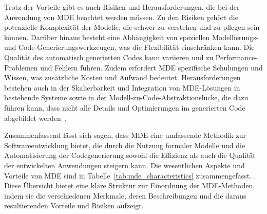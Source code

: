Trotz der Vorteile gibt es auch Risiken und Herausforderungen, die bei der Anwendung von MDE beachtet werden 
müssen. Zu den Risiken gehört die potenzielle Komplexität der Modelle, die schwer zu verstehen und zu pflegen sein 
können. Darüber hinaus besteht eine Abhängigkeit von speziellen Modellierungs- und Code-Generierungswerkzeugen, was 
die Flexibilität einschränken kann. Die Qualität des automatisch generierten Codes kann variieren und zu 
Performance-Problemen und Fehlern führen. Zudem erfordert MDE spezifische Schulungen und Wissen, was zusätzliche
Kosten und Aufwand bedeutet. Herausforderungen bestehen auch in der Skalierbarkeit und Integration von MDE-Lösungen 
in bestehende Systeme sowie in der Modell-zu-Code-Abstraktionslücke, die dazu führen kann, dass nicht alle Details 
und Optimierungen im generierten Code abgebildet werden~\cite{france2007model}.

Zusammenfassend lässt sich sagen, dass MDE eine umfassende Methodik zur Softwareentwicklung bietet, die durch 
die Nutzung formaler Modelle und die Automatisierung der Codegenerierung sowohl die Effizienz als auch die 
Qualität der entwickelten Anwendungen steigern kann. Die wesentlichen Aspekte und Vorteile von MDE sind 
in Tabelle~\ref{tab:mde_characteristics} zusammengefasst. Diese Übersicht bietet eine klare Struktur zur 
Einordnung der MDE-Methoden, indem sie die verschiedenen Merkmale, deren Beschreibungen und die daraus 
resultierenden Vorteile und Risiken aufzeigt.

